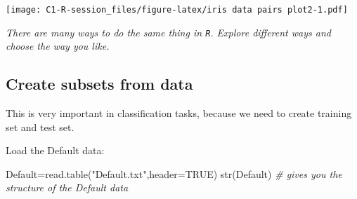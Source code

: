 \documentclass[
]{article}
\newenvironment{Shaded}{\begin{snugshade}}{\end{snugshade}}
\newcommand{\AttributeTok}[1]{\textcolor[rgb]{0.77,0.63,0.00}{#1}}
\newcommand{\CommentTok}[1]{\textcolor[rgb]{0.56,0.35,0.01}{\textit{#1}}}
\newcommand{\ConstantTok}[1]{\textcolor[rgb]{0.00,0.00,0.00}{#1}}
\newcommand{\DecValTok}[1]{\textcolor[rgb]{0.00,0.00,0.81}{#1}}
\newcommand{\FloatTok}[1]{\textcolor[rgb]{0.00,0.00,0.81}{#1}}
\newcommand{\FunctionTok}[1]{\textcolor[rgb]{0.00,0.00,0.00}{#1}}
\newcommand{\NormalTok}[1]{#1}
\newcommand{\OtherTok}[1]{\textcolor[rgb]{0.56,0.35,0.01}{#1}}
\newcommand{\SpecialCharTok}[1]{\textcolor[rgb]{0.00,0.00,0.00}{#1}}
\newcommand{\StringTok}[1]{\textcolor[rgb]{0.31,0.60,0.02}{#1}}
\begin{document}
\begin{Shaded}
\end{Shaded}

\texttt{[image: C1-R-session\_files/figure-latex/iris data pairs plot2-1.pdf]}

\emph{There are many ways to do the same thing in \texttt{R}. Explore
different ways and choose the way you like.}

\hypertarget{create-subsets-from-data}{%
\subsection{Create subsets from data}\label{create-subsets-from-data}}

This is very important in classification tasks, because we need to
create training set and test set.

Load the Default data:

\begin{Shaded}
\begin{Highlighting}[]
\NormalTok{Default}\OtherTok{=}\FunctionTok{read.table}\NormalTok{(}\StringTok{"Default.txt"}\NormalTok{,}\AttributeTok{header=}\ConstantTok{TRUE}\NormalTok{)}
\FunctionTok{str}\NormalTok{(Default) }\CommentTok{\# gives you the structure of the Default data}
\end{Highlighting}
\end{Shaded}
\end{document}
